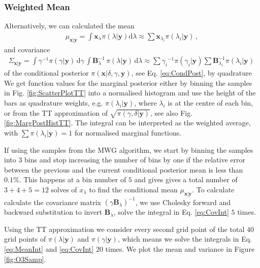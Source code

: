 \subsubsection{Weighted Mean}
Alternatively, we can calculated the mean
\begin{align}
	\mu_{\bm{x}|\bm{y}} = \int \bm{x}_{\lambda} \pi(\lambda| \bm{y}) \text{d}\lambda \approx \sum \bm{x}_{\lambda_i} \pi(\lambda_i| \bm{y}) \, , \label{eq:MeanInt}
\end{align} and covariance
 \begin{align}
 	\Sigma_{\bm{x}|\bm{y}} = \int \gamma^{-1}  \pi(\gamma | \bm{y} ) \, \text{d} \gamma \, \int  \bm{B}_{\lambda}^{-1} \, \pi(\lambda | \bm{y} )  \, \text{d} \lambda  \approx \sum {\gamma_i}^{-1}\pi(\gamma_i| \bm{y}) \sum \bm{B}_{\lambda_i}^{-1}\pi(\lambda_i| \bm{y})\, \label{eq:CovInt}
 \end{align}
of the conditional posterior $\pi(\bm{x}| \delta, \gamma, \bm{y})$, see Eq. \ref{eq:CondPost}, by quadrature \cite[Sec. 2.1]{Dick_Kuo_Sloan_2013}
We get function values for the marginal posterior either by binning the samples in Fig. \ref{fig:ScatterPlotTT} into a normalised histogram and use the height of the bars as quadrature weights, e.g. $\pi(\lambda_i| \bm{y})$, where $\lambda_i$ is at the centre of each bin, or from the TT approximation of $\sqrt{ \pi(\gamma, \delta | \bm{y}) }$, see also Fig. \ref{fig:MargPostHistTT}.
The integral can be interpreted as the weighted average, with $\sum \pi(\lambda_i| \bm{y}) = 1$ for normalised marginal functions.

If using the samples from the MWG algorithm, we start by binning the samples into $3$ bins and stop increasing the number of bins by one if the relative error between the previous and the current conditional posterior mean is less than $0.1\%$.
This happens at a bin number of $5$ and gives gives a total number of $3+4+5 = 12$ solves of $x_{\lambda}$ to find the conditional mean $	\mu_{\bm{x}|\bm{y}}$.
To calculate calculate the covariance matrix $(\gamma \bm{B}_{\lambda})^{-1} $, we use Cholesky forward and backward substitution to invert $\bm{B}_{\lambda}$, solve the integral in Eq. \ref{eq:CovInt} $5$ times.

Using the TT approximation we consider every second grid point of the total $40$ grid points of $\pi(\lambda| \bm{y})$ and $\pi(\gamma| \bm{y})$, which means we solve the integrals in Eq. \ref{eq:MeanInt} and \ref{eq:CovInt} 20 times.
We plot the mean and variance in Figure \ref{fig:O3Samp}.


